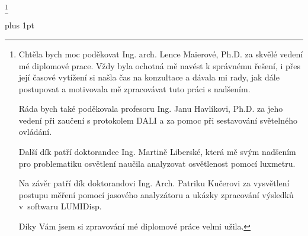 \thanks {           %
   Chtěla bych moc poděkovat Ing. arch. Lence Maierové, Ph.D. za skvělé vedení mé diplomové prace.
   Vždy byla ochotná mě navést k správnému řešení, i přes její časové vytížení si našla čas na konzultace a dávala mi rady,
   jak dále postupovat a motivovala mě zpracovávat tuto práci s nadšením.

   Ráda bych také poděkovala profesoru Ing. Janu Havlíkovi, Ph.D. za jeho vedení při zaučení s protokolem DALI
   a za pomoc při sestavování světelného ovládání.

   Další dík patří doktorandce Ing. Martině Liberské,
   která mě svým nadšením pro problematiku osvětlení naučila analyzovat osvětlenost pomocí luxmetru.

   Na závěr patří dík doktorandovi Ing. Arch. Patriku Kučerovi za vysvětlení postupu měření pomocí jasového analyzátoru
   a ukázky zpracování výsledků v~softwaru LUMIDisp.

   Díky Vám jsem si zpravování mé diplomové práce velmi užila.

}



\ifx\usedraft\undefined
\else
   \draft
\fi


\parskip=3pt plus 1pt %




\makefront  %

